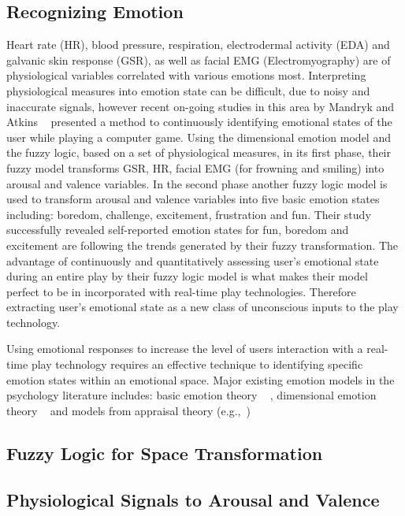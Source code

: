 \documentclass{uofsthesis-cs}
\begin{document}
\subsection{Recognizing Emotion} %
Heart rate (HR), blood pressure, respiration, electrodermal activity (EDA) and galvanic skin response (GSR), as well as facial EMG (Electromyography) are of physiological variables correlated with various emotions most. Interpreting physiological measures into emotion state can be difficult, due to noisy and inaccurate signals, however recent on-going studies in this area by Mandryk and Atkins ~\cite{mandryk2007fuzzy} presented a method to continuously identifying emotional states of the user while playing a computer game. Using the dimensional emotion model and the fuzzy logic, based on a set of physiological measures, in its first phase, their fuzzy model transforms GSR, HR, facial EMG (for frowning and smiling) into arousal and valence variables. In the second phase another fuzzy logic model is used to transform arousal and valence variables into five basic emotion states including: boredom, challenge, excitement, frustration and fun. Their study successfully revealed self-reported emotion states for fun, boredom and excitement are following the trends generated by their fuzzy transformation. The advantage of continuously and quantitatively assessing user's emotional state during an entire play by their fuzzy logic model is what makes their model perfect to be in incorporated with real-time play technologies. Therefore extracting user's emotional state as a new class of unconscious inputs to the play technology.

Using emotional responses to increase the level of users interaction with a real-time play technology requires an effective technique to identifying specific emotion states within an emotional space. Major existing emotion models in the psychology literature includes: basic emotion theory ~\cite{ekman1992argument, ekman1992there} , dimensional emotion theory ~\cite{lang1995emotion, russell1980circumplex} and models from appraisal theory (e.g.,~\cite{roseman2001model}) ~\cite{zhang2010service}


\subsection{Fuzzy Logic for Space Transformation}
\subsection{Physiological Signals to Arousal and Valence}
\end{document}
